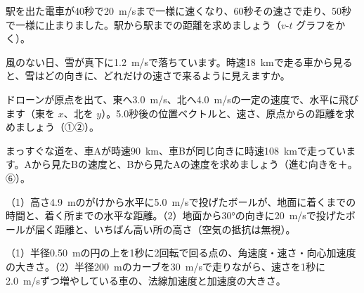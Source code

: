 \bkproblem 駅を出た電車が40秒で\qty{20}{m/s}まで一様に速くなり、60秒その速さで走り、50秒で一様に止まりました。駅から駅までの距離を求めましょう（$v$-$t$ グラフをかく）。

\bkproblem 風のない日、雪が真下に\qty{1.2}{m/s}で落ちています。時速\qty{18}{km}で走る車から見ると、雪はどの向きに、どれだけの速さで来るように見えますか。

\bkproblem ドローンが原点を出て、東へ\qty{3.0}{m/s}、北へ\qty{4.0}{m/s}の一定の速度で、水平に飛びます（東を $x$、北を $y$）。5.0秒後の位置ベクトルと、速さ、原点からの距離を求めましょう（①②）。

\bkproblem まっすぐな道を、車Aが時速\qty{90}{km}、車Bが同じ向きに時速\qty{108}{km}で走っています。Aから見たBの速度と、Bから見たAの速度を求めましょう（進む向きを＋。⑥）。

\bkproblem （1）高さ\qty{4.9}{m}のがけから水平に\qty{5.0}{m/s}で投げたボールが、地面に着くまでの時間と、着く所までの水平な距離。（2）地面から30°の向きに\qty{20}{m/s}で投げたボールが届く距離と、いちばん高い所の高さ（空気の抵抗は無視）。

\bkproblem （1）半径\qty{0.50}{m}の円の上を1秒に2回転で回る点の、角速度・速さ・向心加速度の大きさ。（2）半径\qty{200}{m}のカーブを\qty{30}{m/s}で走りながら、速さを1秒に\qty{2.0}{m/s}ずつ増やしている車の、法線加速度と加速度の大きさ。

